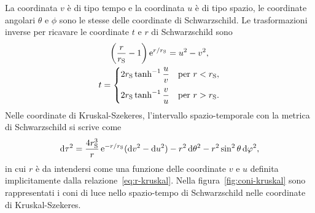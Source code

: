 La coordinata \(v\) è di tipo tempo e la coordinata \(u\) è di tipo spazio, le
coordinate angolari \(\theta\) e \(\phi\) sono le stesse delle coordinate di
Schwarzschild.  Le trasformazioni inverse per ricavare le coordinate \(t\) e
\(r\) di Schwarzschild sono
\begin{subequations}
  \allowdisplaybreaks{}
  \begin{gather}
    \label{eq:r-kruskal}
    \biggl(\frac{r}{r_{\textup{S}}} - 1\biggr)\e^{r/r_{\textup{S}}} = u^{2} -
                                                                      v^{2}, \\
    t =
        \begin{cases}
          2r_{\textup{S}}\tanh^{-1}\dfrac{u}{v} & \text{per \(r <
            r_{\textup{S}}\)}, \\[2.1ex]
          2r_{\textup{S}}\tanh^{-1}\dfrac{v}{u} & \text{per \(r >
            r_{\textup{S}}\)}.
        \end{cases}
  \end{gather}
\end{subequations}
Nelle coordinate di Kruskal-Szekeres, l'intervallo spazio-temporale con la
metrica di Schwarzschild si scrive come
\begin{equation}
  \mathop{}\!\mathrm{d}\tau^{2} = \frac{4r_{\textup{S}}^{3}}{r}\operatorname{\mathrm{e}}^{-r/r_{\textup{S}}}(\mathop{}\!\mathrm{d} v^{2} -
  \mathop{}\!\mathrm{d} u^{2}) - r^{2}\mathop{}\!\mathrm{d}\theta^{2} - r^{2}\sin^{2}\theta\mathop{}\!\mathrm{d}\varphi^{2},
\end{equation}
in cui \(r\) è da intendersi come una funzione delle coordinate \(v\) e \(u\)
definita implicitamente dalla relazione~\eqref{eq:r-kruskal}.  Nella
figura~\ref{fig:coni-kruskal} sono rappresentati i coni di luce nello
spazio-tempo di Schwarzschild nelle coordinate di Kruskal-Szekeres.

